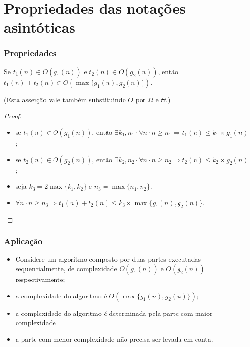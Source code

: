 \documentclass{beamer}
\begin{document}
\section{Propriedades das notações asintóticas}

\begin{frame}
\frametitle{Propriedades}
\begin{theorem}
\label{teo:soma-sup}
Se $t_1(n) \in O(g_1(n))$ e $t_2(n) \in O(g_2(n))$, então
$t_1(n) + t_2(n) \in O(\max\{g_1(n), g_2(n)\})$.

(Esta asserção vale também substituindo $O$ por $\Omega$ e $\Theta$.)
\end{theorem}
\begin{proof}
\begin{itemize}
\item se $t_1(n) \in O(g_1(n))$, então $\exists k_1, n_1 \cdot \forall n \cdot n \ge n_1 \Rightarrow t_1(n) \le k_1 \times g_1(n)$;
\item se $t_2(n) \in O(g_2(n))$, então $\exists k_2, n_2 \cdot \forall n \cdot n \ge n_2 \Rightarrow t_2(n) \le k_2 \times g_2(n)$;
\item seja $k_3 = 2 \max\{k_1, k_2\}$ e $n_3 = \max\{n_1, n_2\}$.
\item $\forall n \cdot n \ge n_3 \Rightarrow t_1(n) + t_2(n) \le k_3 \times \max\{g_1(n), g_2(n)\}$.
\end{itemize}
\end{proof}
\end{frame}

\begin{frame}
\frametitle{Aplicação}
\begin{itemize}
\item Considere um algoritmo composto por duas partes executadas
  sequencialmente, de complexidade $O(g_1(n))$ e $O(g_2(n))$ respectivamente;
\item a complexidade do algoritmo é $O(\max\{g_1(n), g_2(n)\})$;
\item a complexidade do algoritmo é determinada pela parte com maior
  complexidade
\item a parte com menor complexidade não precisa ser levada em conta.
\end{itemize}

\end{frame}
\end{document}
